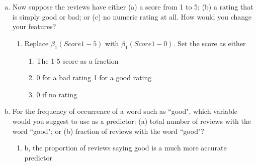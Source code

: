 \documentclass[11pt]{article}
\begin{document}
\begin{enumerate}
\begin{enumerate}[(a)]
\item Now suppose the reviews have either (a) a score from 1 to 5;
(b) a rating that is simply good or bad; or (c) no numeric rating at all.
How would you change your features?
\begin{enumerate}
    \item Replace \(\beta_1(Score 1-5)\) with \(\beta_1(Score 1-0)\). Set the score as either
    \begin{enumerate}
        \item The 1-5 score as a fraction
        \item 0 for a bad rating 1 for a good rating
        \item 0 if no rating
    \end{enumerate}
\end{enumerate}
\item For the frequency of occurrence of a word such as ``good",
which variable would you suggest to use as a predictor:
(a) total number of reviews with the word ``good";
or (b) fraction of reviews with the word ``good"?
\begin{enumerate}
    \item b, the proportion of reviews saying good is a much more accurate predictor
\end{enumerate}
\end{enumerate}


\end{enumerate}
\end{document}
